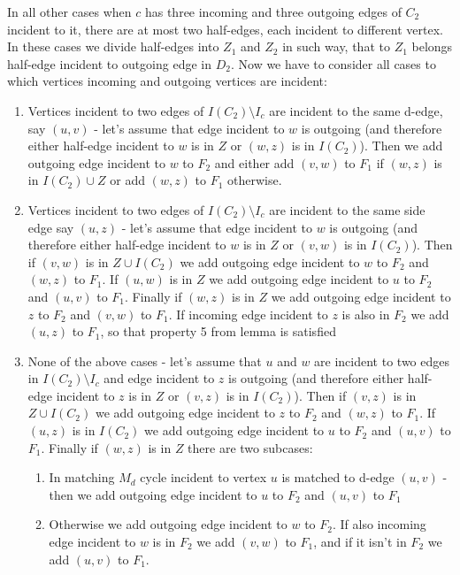 \documentclass[a4, 11pt]{article}
\newcommand{\<}{\langle}
\renewcommand{\>}{\rangle}
\begin{document}
In all other cases when $c$ has three incoming and three outgoing edges of $C_2$ incident to it, there are at most two half-edges, each incident to different vertex. In these cases we divide half-edges into $Z_1$ and $Z_2$ in such way, that to $Z_1$ belongs half-edge incident to outgoing edge in $D_2$. Now we have to consider all cases to which vertices incoming and outgoing vertices are incident:
\begin{enumerate}
	\item Vertices incident to two edges of $I(C_2) \setminus I_c$ are incident to the same d-edge, say $(u,v)$ - let's assume that edge incident to $w$ is outgoing (and therefore either half-edge incident to $w$ is in $Z$ or $(w,z)$ is in $I(C_2)$). Then we add outgoing edge incident to $w$ to $F_2$ and either add $(v,w)$ to $F_1$ if $(w,z)$ is in $I(C_2) \cup Z$ or add $(w,z)$ to $F_1$ otherwise.
	\item Vertices incident to two edges of $I(C_2) \setminus I_c$ are incident to the same side edge say $(u,z)$ - let's assume that edge incident to $w$ is outgoing (and therefore either half-edge incident to $w$ is in $Z$ or $(v,w)$ is in $I(C_2)$). Then if $(v,w)$ is in $Z \cup I(C_2)$ we add outgoing edge incident to $w$ to $F_2$ and $(w,z)$ to $F_1$. If $(u,w)$ is in $Z$ we add outgoing edge incident to $u$ to $F_2$ and $(u,v)$ to $F_1$. Finally if $(w,z)$ is in $Z$ we add outgoing edge incident to $z$ to $F_2$ and $(v,w)$ to $F_1$. If incoming edge incident to $z$ is also in $F_2$ we add $(u,z)$ to $F_1$, so that property 5 from lemma is satisfied
	\item None of the above cases - let's assume that $u$ and $w$ are incident to two edges in $I(C_2) \setminus I_c$ and edge incident to $z$ is outgoing (and therefore either half-edge incident to $z$ is in $Z$ or $(v,z)$ is in $I(C_2)$). Then if $(v,z)$ is in $Z \cup I(C_2)$ we add outgoing edge incident to $z$ to $F_2$ and $(w,z)$ to $F_1$. If $(u,z)$ is in $I(C_2)$ we add outgoing edge incident to $u$ to $F_2$ and $(u,v)$ to $F_1$. Finally if $(w,z)$ is in $Z$ there are two subcases:
		\begin{enumerate}
			\item In matching $M_d$ cycle incident to vertex $u$ is matched to d-edge $(u,v)$ - then we add outgoing edge incident to $u$ to $F_2$ and $(u,v)$ to $F_1$
			\item Otherwise we add outgoing edge incident to $w$ to $F_2$. If also incoming edge incident to $w$ is in $F_2$ we add $(v,w)$ to $F_1$, and if it isn't in $F_2$ we add $(u,v)$ to $F_1$.
		\end{enumerate}
\end{enumerate}
 
\end{document}

